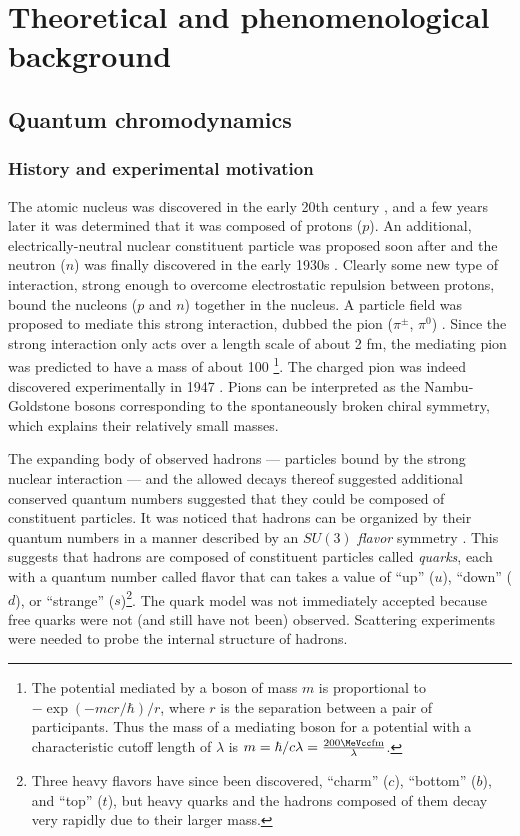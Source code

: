 \chapter{Theoretical and phenomenological background}
\label{ch:background}
\graphicspath{{Chapter-Background/figures/}}

\section{Quantum chromodynamics}
\subsection{History and experimental motivation}

The atomic nucleus was discovered in the early 20th century \cite{Rutherford:1911zz}, and a few years later it was determined that it was composed of protons ($p$).
An additional, electrically-neutral nuclear constituent particle was proposed soon after and the neutron ($n$) was finally discovered in the early 1930s \cite{Chadwick:1932ma}.
Clearly some new type of interaction, strong enough to overcome electrostatic repulsion between protons, bound the nucleons ($p$ and $n$) together in the nucleus.
A particle field was proposed to mediate this strong interaction, dubbed the pion ($\pi^\pm$, $\pi^0$) \cite{Yukawa:1935xg}.
Since the strong interaction only acts over a length scale of about 2 fm, the mediating pion was predicted to have a mass of about 100 \MeV\footnote{The potential mediated by a boson of mass $m$ is proportional to \( - \exp(-mcr/\hbar)/r\), where $r$ is the separation between a pair of participants. Thus the mass of a mediating boson for a potential with a characteristic cutoff length of $\lambda$ is $m = \hbar/c\lambda = \frac{200 \MeVcc \textrm{fm}}{\lambda}$.}.
The charged pion was indeed discovered experimentally in 1947 \cite{Lattes:1947mw}.
Pions can be interpreted as the Nambu-Goldstone bosons corresponding to the spontaneously broken chiral symmetry, which explains their relatively small masses.

The expanding body of observed hadrons --- particles bound by the strong nuclear interaction --- and the allowed decays thereof suggested additional conserved quantum numbers suggested that they could be composed of constituent particles.
It was noticed that hadrons can be organized by their quantum numbers in a manner described by an $SU(3)$ \emph{flavor} symmetry \cite{GellMann:1962xb}.
This suggests that hadrons are composed of constituent particles called \emph{quarks}, each with a quantum number called flavor that can takes a value of ``up'' ($u$), ``down'' ($d$), or ``strange'' ($s$)\footnote{Three heavy flavors have since been discovered, ``charm'' ($c$), ``bottom'' ($b$), and ``top'' ($t$), but heavy quarks and the hadrons composed of them decay very rapidly due to their larger mass.}.
The quark model was not immediately accepted because free quarks were not (and still have not been) observed.
Scattering experiments were needed to probe the internal structure of hadrons.

